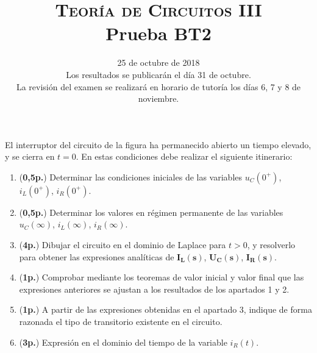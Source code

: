 \documentclass[12pt]{article}
\newcommand{\laplace}[1]{\mathbf{#1}(\mathbf{s})}
\begin{document}
\title{\textsc{Teoría de Circuitos III}\\Prueba BT2}

\date{25 de octubre de  2018\\\small{Los resultados se publicarán el día 31 de octubre.\\La revisión del examen se realizará en horario de tutoría los días 6, 7 y 8 de noviembre.}}

\maketitle

El interruptor del circuito de la figura ha permanecido abierto un tiempo elevado, y se cierra en $t = 0$. En estas condiciones debe realizar el siguiente itinerario:

\begin{enumerate}
\item (\textbf{0,5p.}) Determinar las condiciones iniciales de las variables $u_C(0^+)$, $i_L(0^+)$, $i_R(0^+)$.
\item (\textbf{0,5p.}) Determinar los valores en régimen permanente de las variables $u_C(\infty)$, $i_L(\infty)$, $i_R(\infty)$.
\item (\textbf{4p.}) Dibujar el circuito en el dominio de Laplace para $t > 0$, y resolverlo para obtener las expresiones analíticas de $\laplace{I_L}$, $\laplace{U_C}$, $\laplace{I_R}$.
\item (\textbf{1p.}) Comprobar mediante los teoremas de valor inicial y valor final que las expresiones anteriores se ajustan a los resultados de los apartados 1 y 2.

\item (\textbf{1p.}) A partir de las expresiones obtenidas en el apartado 3, indique de forma razonada el tipo de transitorio existente en el circuito.

\item (\textbf{3p.}) Expresión en el dominio del tiempo de la variable $i_R(t)$.
\end{enumerate}
\end{document}
